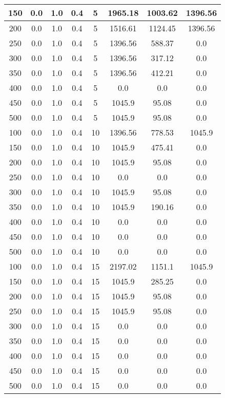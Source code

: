 \documentclass[a4paper, 12pt]{extreport}
\begin{document}
\begin{itemize}
\begin{longtable}{|c|c|c|c|c|c|c|c|}
			150 & 0.0 & 1.0 & 0.4 & 5 & 1965.18 & 1003.62 & 1396.56 \\\hline
			200 & 0.0 & 1.0 & 0.4 & 5 & 1516.61 & 1124.45 & 1396.56 \\\hline
			250 & 0.0 & 1.0 & 0.4 & 5 & 1396.56 & 588.37 & 0.0 \\\hline
			300 & 0.0 & 1.0 & 0.4 & 5 & 1396.56 & 317.12 & 0.0 \\\hline
			350 & 0.0 & 1.0 & 0.4 & 5 & 1396.56 & 412.21 & 0.0 \\\hline
			400 & 0.0 & 1.0 & 0.4 & 5 & 0.0 & 0.0 & 0.0 \\\hline
			450 & 0.0 & 1.0 & 0.4 & 5 & 1045.9 & 95.08 & 0.0 \\\hline
			500 & 0.0 & 1.0 & 0.4 & 5 & 1045.9 & 95.08 & 0.0 \\\hline
			100 & 0.0 & 1.0 & 0.4 & 10 & 1396.56 & 778.53 & 1045.9 \\\hline
			150 & 0.0 & 1.0 & 0.4 & 10 & 1045.9 & 475.41 & 0.0 \\\hline
			200 & 0.0 & 1.0 & 0.4 & 10 & 1045.9 & 95.08 & 0.0 \\\hline
			250 & 0.0 & 1.0 & 0.4 & 10 & 0.0 & 0.0 & 0.0 \\\hline
			300 & 0.0 & 1.0 & 0.4 & 10 & 1045.9 & 95.08 & 0.0 \\\hline
			350 & 0.0 & 1.0 & 0.4 & 10 & 1045.9 & 190.16 & 0.0 \\\hline
			400 & 0.0 & 1.0 & 0.4 & 10 & 0.0 & 0.0 & 0.0 \\\hline
			450 & 0.0 & 1.0 & 0.4 & 10 & 0.0 & 0.0 & 0.0 \\\hline
			500 & 0.0 & 1.0 & 0.4 & 10 & 0.0 & 0.0 & 0.0 \\\hline
			100 & 0.0 & 1.0 & 0.4 & 15 & 2197.02 & 1151.1 & 1045.9 \\\hline
			150 & 0.0 & 1.0 & 0.4 & 15 & 1045.9 & 285.25 & 0.0 \\\hline
			200 & 0.0 & 1.0 & 0.4 & 15 & 1045.9 & 95.08 & 0.0 \\\hline
			250 & 0.0 & 1.0 & 0.4 & 15 & 1045.9 & 95.08 & 0.0 \\\hline
			300 & 0.0 & 1.0 & 0.4 & 15 & 0.0 & 0.0 & 0.0 \\\hline
			350 & 0.0 & 1.0 & 0.4 & 15 & 0.0 & 0.0 & 0.0 \\\hline
			400 & 0.0 & 1.0 & 0.4 & 15 & 0.0 & 0.0 & 0.0 \\\hline
			450 & 0.0 & 1.0 & 0.4 & 15 & 0.0 & 0.0 & 0.0 \\\hline
			500 & 0.0 & 1.0 & 0.4 & 15 & 0.0 & 0.0 & 0.0 \\\hline

\end{longtable}
\end{itemize}
\end{document}
